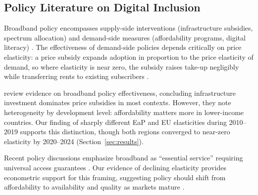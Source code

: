 \subsection{Policy Literature on Digital Inclusion}

Broadband policy encompasses supply-side interventions (infrastructure subsidies, spectrum allocation) and demand-side measures (affordability programs, digital literacy) \citep{oecd2020broadband}. The effectiveness of demand-side policies depends critically on price elasticity: a price subsidy expands adoption in proportion to the price elasticity of demand, so where elasticity is near zero, the subsidy raises take-up negligibly while transferring rents to existing subscribers \citep{hauge2010demand, guermazi2021digital}.

\citet{bertschek2016drivers} review evidence on broadband policy effectiveness, concluding infrastructure investment dominates price subsidies in most contexts. However, they note heterogeneity by development level: affordability matters more in lower-income countries. Our finding of sharply different EaP and EU elasticities during 2010--2019 supports this distinction, though both regions converged to near-zero elasticity by 2020--2024 (Section~\ref{sec:results}).

Recent policy discussions emphasize broadband as ``essential service'' requiring universal access guarantees \citep{oecd2020broadband}. Our evidence of declining elasticity provides econometric support for this framing, suggesting policy should shift from affordability to availability and quality as markets mature \citep{ecorys2013evaluation}.
